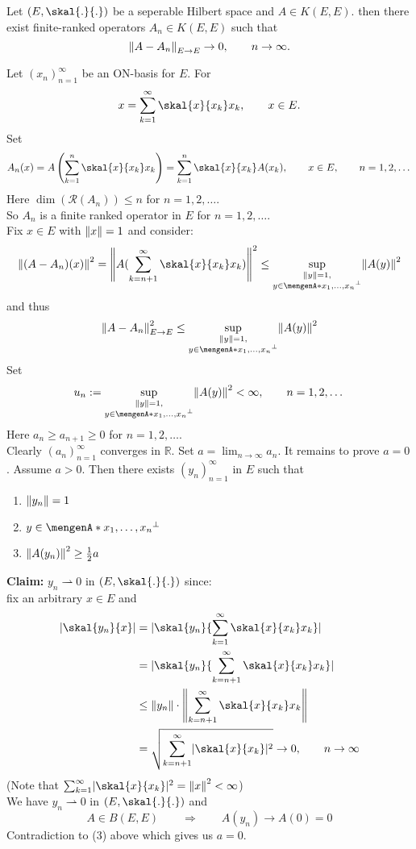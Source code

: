 \begin{proposition}
	Let $(E, \skal{.}{.})$ be a seperable Hilbert space and $A \in K(E,E)$. then there exist finite-ranked operators $A_n \in K(E,E)$ such that
	\[
		\norm{A-A_n}_{E \to E} \to 0, \qquad n \to \infty.
	\]
\end{proposition}
\begin{beweis}
	Let $(x_n)_{n=1}^{\infty}$ be an ON-basis for $E$. For 
	\[
		x = \sum_{k=1}^{\infty} \skal{x}{x_k}x_k, \qquad x \in E.
	\]
	Set 
	\[
		A_n(x) = A \left( \sum_{k=1}^{n}\skal{x}{x_k}x_k \right) = \sum_{k=1}^{n} \skal{x}{x_k}A(x_k), \qquad x \in E, \qquad n=1,2,\dots
	\]
	Here $\dim( \mathcal{R}(A_n)) \leq n$ for $n =1,2,\dots$. \\
	So $A_n$ is a finite ranked operator in $E$ for $n=1,2,\dots$. \\
	Fix $x \in E$ with $\norm{x}=1$ and consider:
	\[
		\norm{(A-A_n)(x)}^2 = \norm{A(\sum_{k=n+1}^{\infty} \skal{x}{x_k}x_k)}^2 \leq \sup\limits_{\substack{\norm{y}=1, \\ y \in \set{x_1,\dots,x_n}^{\perp}}}
		\norm{A(y)}^2
	\]
	and thus
	\[
		\norm{A-A_n}_{E \to E}^2 \leq \sup\limits_{\substack{\norm{y}=1, \\ y \in \set{x_1,\dots,x_n}^{\perp}}} \norm{A(y)}^2
	\]
	Set 
	\[
		u_n := \sup\limits_{\substack{\norm{y}=1, \\ y \in \set{x_1,\dots,x_n}^{\perp}}} \norm{A(y)}^2 < \infty, \qquad n =1,2,\dots
	\]
	Here $a_n \geq a_{n+1} \geq 0$ for $n=1,2,\dots$. \\
	Clearly $(a_n)_{n=1}^{\infty}$ converges in $\mathbb{R}$. Set $a = \lim_{n \to \infty}a_n$. It remains to prove $a =0$.
	Assume $a>0$. Then there exists $(y_n)_{n=1}^{\infty}$ in $E$ such that
	\begin{enumerate}
		\item $\norm{y_n}=1$
		\item $y \in \set{x_1,\dots,x_n}^{\perp}$
		\item $\norm{A(y_n)}^2 \geq \frac{1}{2} a$
	\end{enumerate}
	\textbf{Claim:} \text{    } $y_n \rightharpoonup 0$ in $(E,\skal{.}{.})$ since: \\
	fix an arbitrary $x \in E$ and
	\begin{align*}
		\abs{\skal{y_n}{x}} &= \abs{\skal{y_n}{\sum_{k=1}^{\infty} \skal{x}{x_k}x_k}} \\
		&= \abs{\skal{y_n}{\sum_{k=n+1}^{\infty}\skal{x}{x_k}x_k}} \\
		&\leq \norm{y_n} \cdot \norm{\sum_{k=n+1}^{\infty}\skal{x}{x_k}x_k} \\
		&= \sqrt{\sum_{k=n+1}^{\infty}\abs{\skal{x}{x_k}}^2} \to 0, \qquad n \to \infty
	\end{align*}
	(Note that $\sum_{k=1}^{\infty}\abs{\skal{x}{x_k}}^2 = \norm{x}^2 < \infty$) \\
	We have $y_n \rightharpoonup 0$ in $(E, \skal{.}{.})$ and
	\[
		A \in B(E,E) \qquad \Rightarrow \qquad A(y_n) \to A(0)= 0
	\]
	Contradiction to (3) above which gives us $a=0$.
\end{beweis}

